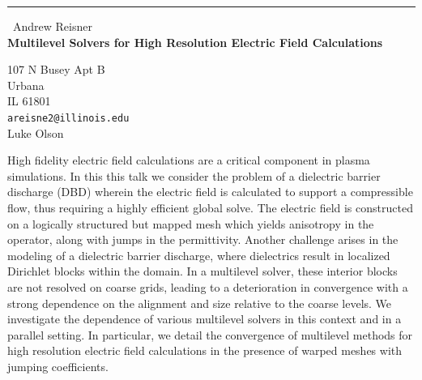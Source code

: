 \documentclass{report}
\begin{document}
\begin{center}
\rule{6in}{1pt} \
{\large Andrew Reisner \\
{\bf Multilevel Solvers for High Resolution Electric Field Calculations}}

107 N Busey Apt B \\ Urbana \\ IL 61801
\\
{\tt areisne2@illinois.edu}\\
Luke Olson\end{center}

High fidelity electric field calculations are a critical component in plasma
simulations. In this this talk we consider the problem of a dielectric
barrier
discharge (DBD) wherein the electric field is calculated to support a
compressible flow, thus requiring a highly efficient global solve. The
electric
field is constructed on a logically structured but mapped mesh which yields
anisotropy in the operator, along with jumps in the permittivity. Another
challenge arises in the modeling of a dielectric barrier discharge, where
dielectrics result in localized Dirichlet blocks within the domain. In a
multilevel solver, these interior blocks are not resolved on coarse grids,
leading to a deterioration in convergence with a strong dependence on the
alignment and size relative to the coarse levels. We investigate the
dependence of various multilevel solvers in this context and in a parallel
setting. In particular, we detail the convergence of multilevel methods for
high resolution electric field calculations in the presence of warped meshes
with jumping coefficients.
\end{document}
